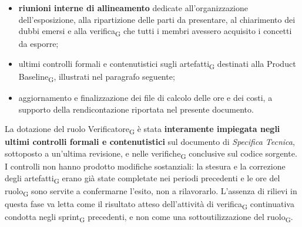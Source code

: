 ﻿\documentclass[a4paper, 10pt, colorlinks=true, linkcolor=black, urlcolor=blue, citecolor=blue, hidelinks]{article}
\begin{document}
\begin{itemize}
    \item \textbf{riunioni interne di allineamento} dedicate all'organizzazione dell'esposizione, alla ripartizione delle parti da presentare, al chiarimento dei dubbi emersi e alla verifica\textsubscript{G} che tutti i membri avessero acquisito i concetti da esporre;

    \item ultimi controlli formali e contenutistici sugli artefatti\textsubscript{G} destinati alla Product Baseline\textsubscript{G}, illustrati nel paragrafo seguente;

    \item aggiornamento e finalizzazione dei file di calcolo delle ore e dei costi, a supporto della rendicontazione riportata nel presente documento.
\end{itemize}

La dotazione del ruolo Verificatore\textsubscript{G} è stata \textbf{interamente impiegata negli ultimi controlli formali e contenutistici} sul documento di \textit{Specifica Tecnica}, sottoposto a un'ultima revisione, e nelle verifiche\textsubscript{G} conclusive sul codice sorgente. I controlli non hanno prodotto modifiche sostanziali: la stesura e la correzione degli artefatti\textsubscript{G} erano già state completate nei periodi precedenti e le ore del ruolo\textsubscript{G} sono servite a confermarne l'esito, non a rilavorarlo. L'assenza di rilievi in questa fase va letta come il risultato atteso dell'attività di verifica\textsubscript{G} continuativa condotta negli sprint\textsubscript{G} precedenti, e non come una sottoutilizzazione del ruolo\textsubscript{G}.
\end{document}

